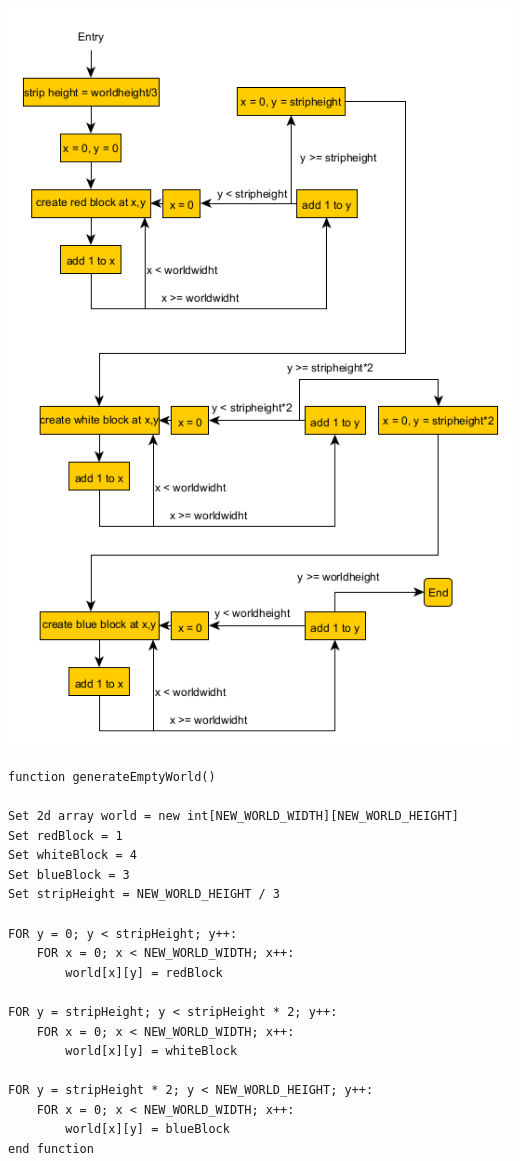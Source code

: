 {\includegraphics[width=\textwidth]{../flowchart/generateEmptyWorld.png}}
\begin{lstlisting}
function generateEmptyWorld()

Set 2d array world = new int[NEW_WORLD_WIDTH][NEW_WORLD_HEIGHT]
Set redBlock = 1
Set whiteBlock = 4
Set blueBlock = 3
Set stripHeight = NEW_WORLD_HEIGHT / 3

FOR y = 0; y < stripHeight; y++:
    FOR x = 0; x < NEW_WORLD_WIDTH; x++:
        world[x][y] = redBlock

FOR y = stripHeight; y < stripHeight * 2; y++:
    FOR x = 0; x < NEW_WORLD_WIDTH; x++:
        world[x][y] = whiteBlock

FOR y = stripHeight * 2; y < NEW_WORLD_HEIGHT; y++:
    FOR x = 0; x < NEW_WORLD_WIDTH; x++:
        world[x][y] = blueBlock
end function
\end{lstlisting}
